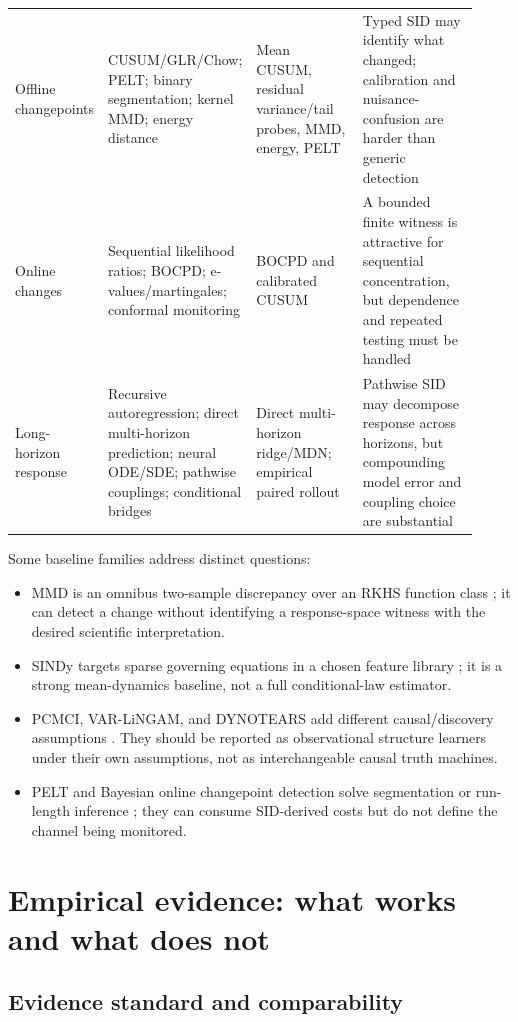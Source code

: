 \documentclass[10pt]{article}
\begin{document}
\begin{longtable}{@{}p{0.16\linewidth}p{0.24\linewidth}p{0.25\linewidth}p{0.27\linewidth}@{}}
Offline changepoints & CUSUM/GLR/Chow; PELT; binary segmentation; kernel MMD; energy distance & Mean CUSUM, residual variance/tail probes, MMD, energy, PELT & Typed SID may identify what changed; calibration and nuisance-confusion are harder than generic detection \\
Online changes & Sequential likelihood ratios; BOCPD; e-values/martingales; conformal monitoring & BOCPD and calibrated CUSUM & A bounded finite witness is attractive for sequential concentration, but dependence and repeated testing must be handled \\
Long-horizon response & Recursive autoregression; direct multi-horizon prediction; neural ODE/SDE; pathwise couplings; conditional bridges & Direct multi-horizon ridge/MDN; empirical paired rollout & Pathwise SID may decompose response across horizons, but compounding model error and coupling choice are substantial \\
\bottomrule
\end{longtable}

Some baseline families address distinct questions:

\begin{itemize}
  \item MMD is an omnibus two-sample discrepancy over an RKHS function class \cite{gretton2012}; it can detect a change without identifying a response-space witness with the desired scientific interpretation.
  \item SINDy targets sparse governing equations in a chosen feature library \cite{brunton2016}; it is a strong mean-dynamics baseline, not a full conditional-law estimator.
  \item PCMCI, VAR-LiNGAM, and DYNOTEARS add different causal/discovery assumptions \cite{runge2019,hyvarinen2010,pamfil2020}. They should be reported as observational structure learners under their own assumptions, not as interchangeable causal truth machines.
  \item PELT and Bayesian online changepoint detection solve segmentation or run-length inference \cite{killick2012,adams2007}; they can consume SID-derived costs but do not define the channel being monitored.
\end{itemize}

\section{Empirical evidence: what works and what does not}

\subsection{Evidence standard and comparability}
\end{document}

